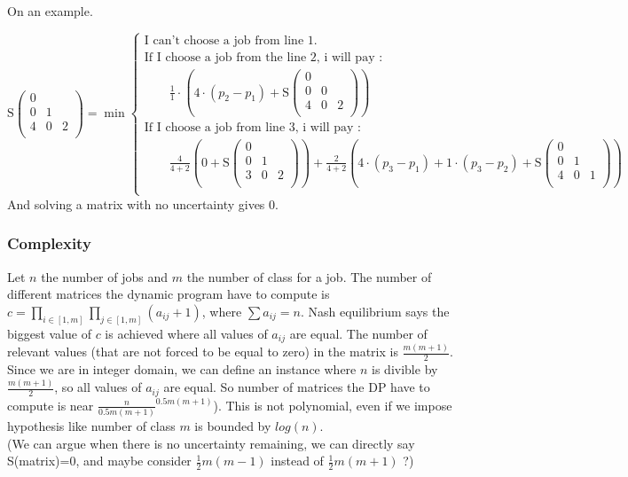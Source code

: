 \documentclass{article}
\begin{document}
On an example.

$$
\text{S} \begin{pmatrix}
            0 &   &   \\
            0 & 1 &   \\ 
            4 & 0 & 2 \\
        \end{pmatrix} = \min \begin{cases}
        \text{I can't choose a job from line 1.}\\
        \text{If I choose a job from the line 2, i will pay :}\\
            \hspace{2em}\frac{1}{1}\cdot\left(4\cdot\left(p_2-p_1\right)+ \text{S}\begin{pmatrix}0 &   &   \\0 & 0 &   \\ 4 & 0 & 2 \\ \end{pmatrix}\right) \\ 
        \text{If I choose a job from line 3, i will pay :}\\
            \hspace{2em}\frac{4}{4+2}\left(0+\text{S} \begin{pmatrix}
            0 &   &   \\
            0 & 1 &   \\ 
            3 & 0 & 2 \\
        \end{pmatrix}\right) + \frac{2}{4+2}\left(4\cdot\left(p_3-p_1\right)+1\cdot\left(p_3-p_2\right)+\text{S} \begin{pmatrix}
            0 &   &   \\
            0 & 1 &   \\ 
            4 & 0 & 1 \\
        \end{pmatrix}\right) \\
        \end{cases}
$$
And solving a matrix with no uncertainty gives 0.

\subsubsection*{Complexity}
Let $n$ the number of jobs and $m$ the number of class for a job. The number of different matrices the dynamic program have to compute is $c=\prod_{i\in[1,m]}\prod_{j\in[1,m]}\left(a_{ij}+1\right)$, where $\sum a_{ij}=n$. Nash equilibrium says the biggest value of $c$ is achieved where all values of $a_{ij}$ are equal. The number of relevant values (that are not forced to be equal to zero) in the matrix is $\frac{m(m+1)}{2}$. Since we are in integer domain, we can define an instance where $n$ is divible by $\frac{m(m+1)}{2}$, so all values of $a_{ij}$ are equal. So number of matrices the DP have to compute is near $\frac{n}{0.5m(m+1)}^{0.5m(m+1)}$). This is not polynomial, even if we impose hypothesis like number of class $m$ is bounded by $log(n)$.\\
(We can argue when there is no uncertainty remaining, we can directly say S(matrix)=0, and maybe consider $\frac{1}{2}m(m-1)$ instead of $\frac{1}{2}m(m+1)$ ?)
\end{document}
